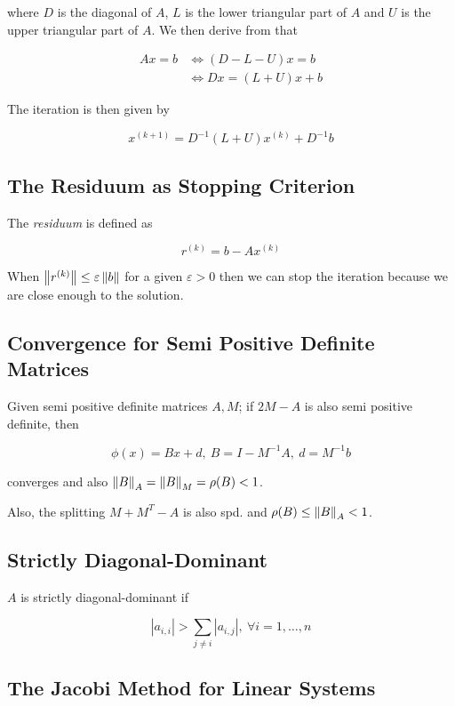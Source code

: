 where \(D\) is the diagonal of \(A\), \(L\) is the lower triangular part of \(A\) and \(U\) is the upper triangular part of \(A\). 
We then derive from that 

\begin{align*}
    Ax = b &\iff (D - L - U)x = b \\ 
           &\iff Dx = (L + U)x + b
\end{align*}

The iteration is then given by

\[
    x^{(k + 1)} = D^{-1}(L + U)x^{(k)} + D^{-1}b
\]

\subsection{The Residuum as Stopping Criterion}

The \emph{residuum} is defined as

\[
    r^{(k)} = b - Ax^{(k)}
\]

When \(\left\| r^{(k)} \right\| \le \varepsilon \left\| b \right\|\) for a given \(\varepsilon > 0\) then we can stop the iteration because we are close enough to the solution.

\subsection{Convergence for Semi Positive Definite Matrices}

Given semi positive definite matrices \(A, M\); if \(2M - A\) is also semi positive definite, then 

\[
    \phi(x) = Bx + d,\ B = I - M^{-1}A, \ d = M^{-1}b
\]

converges and also \(\left\| B \right\|_A = \left\| B \right\|_M = \rho(B) < 1\).

Also, the splitting \(M + M^T - A\) is also spd. and \(\rho(B) \le \left\| B \right\|_A < 1\).

\subsection{Strictly Diagonal-Dominant}

\(A\) is strictly diagonal-dominant if 

\[
    |a_{i,i}| > \sum_{j \ne i} |a_{i,j}|, \ \forall i = 1, \dots, n
\]

\subsection{The Jacobi Method for Linear Systems}

